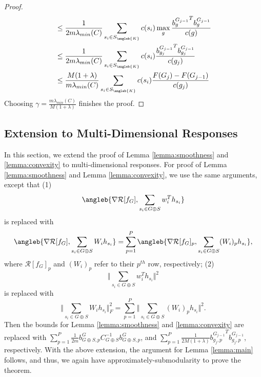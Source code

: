 \begin{proof}
\begin{align*}
    &\leq
        \frac{1}{2m\lambda_{min}(C)} \sum _{s_i \in S_{\angleb{K}}} 
        c(s_i) \max_{g} \frac{{b^{G_{j-1}}_{g}}^T{b^{G_{j-1}}_{g}}}{c(g)} \\
    &\leq
        \frac{1}{2m\lambda_{min}(C)} \sum _{s_i \in S_{\angleb{K}}} 
        c(s_i) \frac{{b^{G_{j-1}}_{g_j}}^T{b^{G_{j-1}}_{g_j}}}{c(g_j)} \\
    &\leq
        \frac{M (1+ \lambda)}{m\lambda_{min}(C)} \sum _{s_i \in S_{\angleb{K}}} 
        c(s_i)
          \frac{ F(G_{j}) - F(G_{j-1}) } { c(g_j) }
  \end{align*}
  Choosing $\gamma = \frac{m\lambda_{min}(C)}{M(1+ \lambda)}$ finishes the proof.
\end{proof}

\subsection{Extension to Multi-Dimensional Responses}
In this section, we extend the proof of Lemma
    \ref{lemma:smoothness} and \ref{lemma:convexity} to multi-dimensional 
responses. 
For proof of Lemma \ref{lemma:smoothness} and Lemma \ref{lemma:convexity},
we use the same arguments, except that 
(1) 
    \[ 
        \angleb{ \nabla \mathcal{R}[f_G], \sum _{s_i \in G\oplus S} w_i^T h_{s_i} }
    \] is replaced with 
    \[ \angleb{ \nabla \mathcal{R}[f_G], \sum _{s_i \in G\oplus S} W_i h_{s_i} } = 
    \sum _{p=1}^P \angleb{ \nabla \mathcal{R}[f_G]_p, \sum _{s_i \in G\oplus S} (W_i)_p h_{s_i} }, \]
where $\mathcal{R}[f_G]_p$ and $(W_i)_p$ refer to their $p^{th}$ row, respectively; 
(2) \[ \Vert \sum _{s_i \in G \oplus S} w_i^T h_{s_i} \Vert ^2 \] 
    is replaced with 
    \[ \Vert \sum _{s_i \in G \oplus S} W_i h_{s_i} \Vert _F^2 = 
     \sum _{p=1}^P \Vert \sum _{s_i \in G \oplus S} (W_i)_p h_{s_i} \Vert ^2.  \]
Then the bounds for Lemma \ref{lemma:smoothness} and \ref{lemma:convexity} are replaced with
$\sum _{p=1}^P \frac{1}{2m} b^G_{G \oplus S, p} C_{G \oplus S}^{-1} b^G_{G\oplus S, p}$, and 
$ \sum _{p=1}^P \frac{1}{2M (1 + \lambda) } {b^{G_{j-1}}_{g_j,p}}^Tb^{G_{j-1}}_{g_j,p}$, respectively. 
With the above extension, the argument for Lemma \ref{lemma:main} follows, and thus, we again have approximately-submodularity 
to prove the theorem. 

 \hline        
        
        


